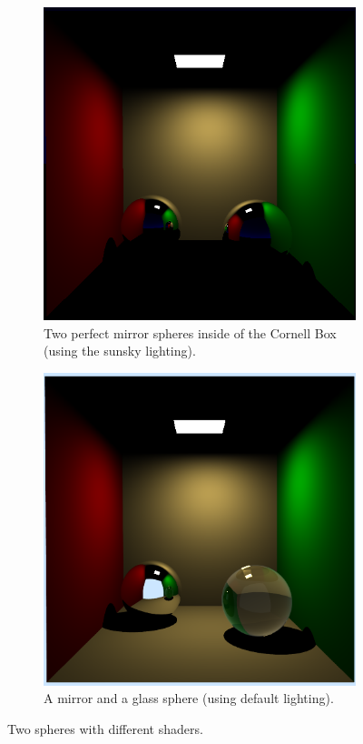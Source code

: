  \begin{figure}[h]
	\centering
	\begin{subfigure}[b]{0.4\textwidth}
		\includegraphics[width=\textwidth]{week3/2mirror.png}
		\caption{Two perfect mirror spheres inside of the Cornell Box (using the sunsky lighting).}
		\label{fig:2mirror}
	\end{subfigure}
	\begin{subfigure}[b]{0.4\textwidth}
		\includegraphics[width=\textwidth]{week3/mirrorglass.png}
		\caption{A mirror and a glass sphere (using default lighting).}
	\end{subfigure}
	
	\caption{Two spheres with different shaders.}
	\label{fig:spherestransparentmirror}
 \end{figure}
 
